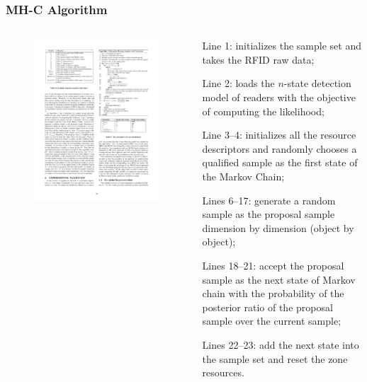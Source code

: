 
\begin{frame}
\frametitle{MH-C Algorithm}

\begin{columns}[c]

\begin{figure}[tb]
  \includegraphics[width=\columnwidth]{figures/3-1/3-1-12.pdf}
\end{figure}

\begin{sitemize}
  \item Line 1: initializes the sample set and takes the RFID raw data;
  \item Line 2: loads the $n$-state detection model of readers with the objective of computing the likelihood;
  \item Line 3--4: initializes all the resource descriptors and randomly chooses a qualified sample as the first state of the Markov Chain;
  \item Lines 6--17: generate a random sample as the proposal sample dimension by dimension (object by object);
  \item Lines 18--21: accept the proposal sample as the next state of Markov chain with the probability of the posterior ratio of the proposal sample over the current sample;
  \item Lines 22--23: add the next state into the sample set and reset the zone resources.
\end{sitemize}


\end{columns}
\end{frame}
